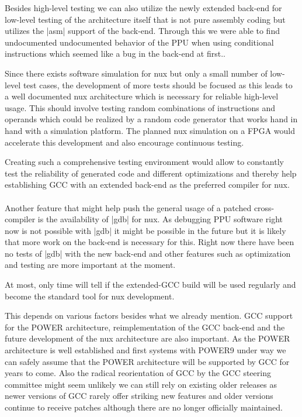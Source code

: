 Besides high-level testing we can also utilize the newly extended back-end for low-level testing of the architecture itself that is not pure assembly coding but utilizes the |asm| support of the back-end.
Through this we were able to find undocumented undocumented behavior of the PPU when using conditional instructions which seemed like a bug in the back-end at first..

Since there exists software simulation for nux but only a small number of low-level test cases, the development of more tests should be focused as this leads to a well documented nux architecture which is necessary for reliable high-level usage.
This should involve testing random combinations of instructions and operands which could be realized by a random code generator that works hand in hand with a simulation platform.
The planned nux simulation on a FPGA would accelerate this development and also encourage continuous testing.

Creating such a comprehensive testing environment would allow to constantly test the reliability of generated code and different optimizations and thereby help establishing GCC with an extended back-end as the preferred compiler for nux.
\\
\\
Another feature that might help push the general usage of a patched cross-compiler is the availability of |gdb| for nux.
As debugging PPU software right now is not possible with |gdb| it might be possible in the future but it is likely that more work on the back-end is necessary for this.
Right now there have been no tests of |gdb| with the new back-end and other features such as optimization and testing are more important at the moment.

At most, only time will tell if the extended-GCC build will be used regularly and become the standard tool for nux development.

This depends on various factors besides what we already mention.
GCC support for the POWER architecture, reimplementation of the GCC back-end and the future development of the nux architecture are also important.
As the POWER architecture is well established and first systems with POWER9 under way we can safely assume that the POWER architecture will be supported by GCC for years to come.
Also the radical reorientation of GCC by the GCC steering committee might seem unlikely we can still rely on existing older releases as newer versions of GCC rarely offer striking new features and older versions continue to receive patches although there are no longer officially maintained.

